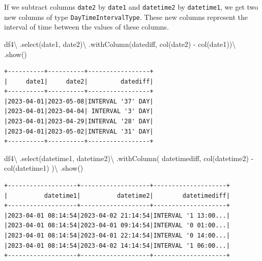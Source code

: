 \documentclass[
  11pt,
  letterpaper,
  DIV=11,
  numbers=noendperiod]{scrreprt}
\newenvironment{Shaded}{\begin{snugshade}}{\end{snugshade}}
\newcommand{\NormalTok}[1]{\textcolor[rgb]{0.00,0.23,0.31}{#1}}
\newcommand{\OperatorTok}[1]{\textcolor[rgb]{0.37,0.37,0.37}{#1}}
\newcommand{\StringTok}[1]{\textcolor[rgb]{0.13,0.47,0.30}{#1}}
\begin{document}
If we subtract columns \texttt{date2} by \texttt{date1} and
\texttt{datetime2} by \texttt{datetime1}, we get two new columns of type
\texttt{DayTimeIntervalType}. These new columns represent the interval
of time between the values of these columns.

\begin{Shaded}
\begin{Highlighting}[]
\NormalTok{df4}\OperatorTok{\textbackslash{}}
\NormalTok{    .select(}\StringTok{\textquotesingle{}date1\textquotesingle{}}\NormalTok{, }\StringTok{\textquotesingle{}date2\textquotesingle{}}\NormalTok{)}\OperatorTok{\textbackslash{}}
\NormalTok{    .withColumn(}\StringTok{\textquotesingle{}datediff\textquotesingle{}}\NormalTok{, col(}\StringTok{\textquotesingle{}date2\textquotesingle{}}\NormalTok{) }\OperatorTok{{-}}\NormalTok{ col(}\StringTok{\textquotesingle{}date1\textquotesingle{}}\NormalTok{))}\OperatorTok{\textbackslash{}}
\NormalTok{    .show()}
\end{Highlighting}
\end{Shaded}

\begin{verbatim}
+----------+----------+-----------------+
|     date1|     date2|         datediff|
+----------+----------+-----------------+
|2023-04-01|2023-05-08|INTERVAL '37' DAY|
|2023-04-01|2023-04-04| INTERVAL '3' DAY|
|2023-04-01|2023-04-29|INTERVAL '28' DAY|
|2023-04-01|2023-05-02|INTERVAL '31' DAY|
+----------+----------+-----------------+
\end{verbatim}

\begin{Shaded}
\begin{Highlighting}[]
\NormalTok{df4}\OperatorTok{\textbackslash{}}
\NormalTok{    .select(}\StringTok{\textquotesingle{}datetime1\textquotesingle{}}\NormalTok{, }\StringTok{\textquotesingle{}datetime2\textquotesingle{}}\NormalTok{)}\OperatorTok{\textbackslash{}}
\NormalTok{    .withColumn(}
        \StringTok{\textquotesingle{}datetimediff\textquotesingle{}}\NormalTok{,}
\NormalTok{        col(}\StringTok{\textquotesingle{}datetime2\textquotesingle{}}\NormalTok{) }\OperatorTok{{-}}\NormalTok{ col(}\StringTok{\textquotesingle{}datetime1\textquotesingle{}}\NormalTok{)}
\NormalTok{    )}\OperatorTok{\textbackslash{}}
\NormalTok{    .show()}
\end{Highlighting}
\end{Shaded}

\begin{verbatim}
+-------------------+-------------------+--------------------+
|          datetime1|          datetime2|        datetimediff|
+-------------------+-------------------+--------------------+
|2023-04-01 08:14:54|2023-04-02 21:14:54|INTERVAL '1 13:00...|
|2023-04-01 08:14:54|2023-04-01 09:14:54|INTERVAL '0 01:00...|
|2023-04-01 08:14:54|2023-04-01 22:14:54|INTERVAL '0 14:00...|
|2023-04-01 08:14:54|2023-04-02 14:14:54|INTERVAL '1 06:00...|
+-------------------+-------------------+--------------------+
\end{verbatim}
\end{document}
